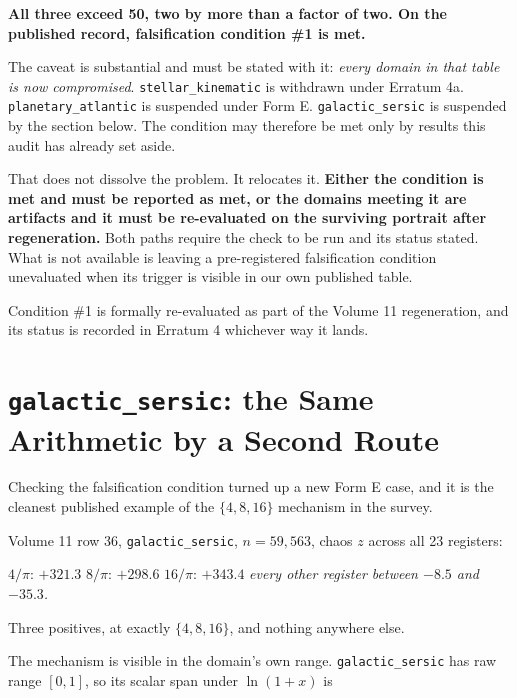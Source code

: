 \documentclass[11pt, letterpaper, openany]{book}
\begin{document}
\begin{erratumbox}
\textbf{All three exceed 50, two by more than a factor of two. On the published record,
falsification condition \#1 is met.}

\medskip
\noindent The caveat is substantial and must be stated with it: \emph{every domain in that
table is now compromised}. \texttt{stellar\_kinematic} is withdrawn under Erratum 4a.
\texttt{planetary\_atlantic} is suspended under Form E. \texttt{galactic\_sersic} is suspended
by the section below. The condition may therefore be met only by results this audit has already
set aside.

\medskip
\noindent That does not dissolve the problem. It relocates it. \textbf{Either the condition is
met and must be reported as met, or the domains meeting it are artifacts and it must be
re-evaluated on the surviving portrait after regeneration.} Both paths require the check to be
run and its status stated. What is not available is leaving a pre-registered falsification
condition unevaluated when its trigger is visible in our own published table.
\end{erratumbox}

Condition \#1 is formally re-evaluated as part of the Volume 11 regeneration, and its status is
recorded in Erratum 4 whichever way it lands.

\section{\texttt{galactic\_sersic}: the Same Arithmetic by a Second Route}

Checking the falsification condition turned up a new Form E case, and it is the cleanest
published example of the $\{4,8,16\}$ mechanism in the survey.

Volume 11 row 36, \texttt{galactic\_sersic}, $n = 59{,}563$, chaos $z$ across all 23 registers:

\begin{center}
\small
$4/\pi$: $\mathbf{+321.3}$ \quad $8/\pi$: $\mathbf{+298.6}$ \quad $16/\pi$: $\mathbf{+343.4}$
\quad \emph{every other register between $-8.5$ and $-35.3$.}
\end{center}

Three positives, at exactly $\{4, 8, 16\}$, and nothing anywhere else.

The mechanism is visible in the domain's own range. \texttt{galactic\_sersic} has raw range
$[0,1]$, so its scalar span under $\ln(1+x)$ is
\end{document}
